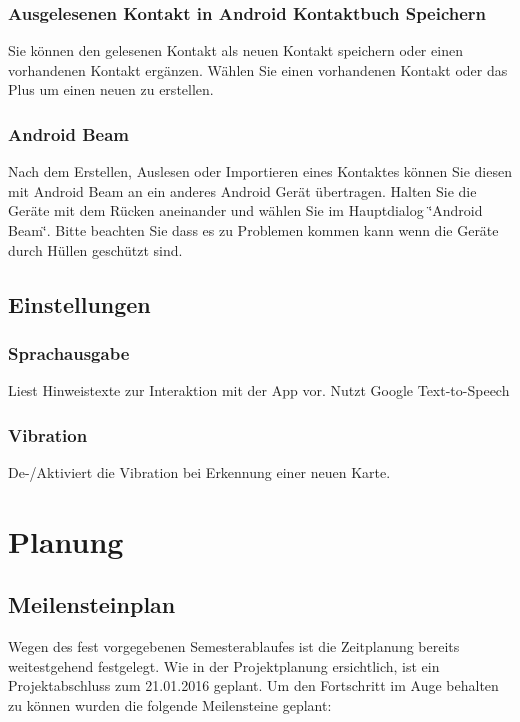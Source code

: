 \documentclass[a4paper,ngerman,12pt]{report}
\begin{document}
\subsection{Ausgelesenen Kontakt in Android Kontaktbuch Speichern}

Sie können den gelesenen Kontakt als neuen Kontakt speichern oder einen vorhandenen Kontakt ergänzen. Wählen Sie einen vorhandenen Kontakt oder das Plus um einen neuen zu erstellen.

\subsection{Android Beam}

Nach dem Erstellen, Auslesen oder Importieren eines Kontaktes können Sie diesen mit Android Beam an ein anderes Android Gerät übertragen. Halten Sie die Geräte mit dem Rücken aneinander und wählen Sie im Hauptdialog \char`\"{}Android Beam\char`\"{}. Bitte beachten Sie dass es zu Problemen kommen kann wenn die Geräte durch Hüllen geschützt sind.

\section{Einstellungen}

\subsection{Sprachausgabe}

Liest Hinweistexte zur Interaktion mit der App vor. Nutzt Google Text-to-Speech 
\subsection{Vibration}

De-/Aktiviert die Vibration bei Erkennung einer neuen Karte. 
 
\chapter{Planung}
\section{Meilensteinplan}

Wegen des fest vorgegebenen Semesterablaufes ist die Zeitplanung bereits weitestgehend festgelegt. Wie in der Projektplanung ersichtlich, ist ein Projektabschluss zum 21.01.2016 geplant. Um den Fortschritt im Auge behalten zu können wurden die folgende Meilensteine geplant:
\end{document}
